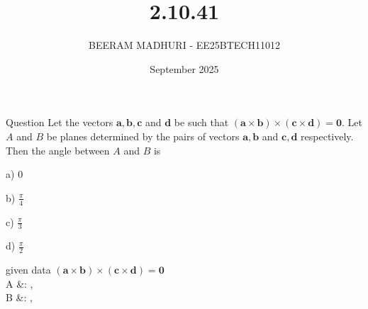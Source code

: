 \documentclass{beamer}
\title %
{2.10.41}
\date{September  2025}
\author %
{BEERAM MADHURI - EE25BTECH11012}
\begin{document}
\frame{\titlepage}
\begin{frame}{Question}
 Let the vectors $\mathbf{a}, \mathbf{b}, \mathbf{c}$ and $\mathbf{d}$ be such that $(\mathbf{a} \times \mathbf{b}) \times (\mathbf{c} \times \mathbf{d}) = \mathbf{0}$. Let $A$ and $B$ be planes determined by the pairs of vectors $\mathbf{a}, \mathbf{b}$ and $\mathbf{c}, \mathbf{d}$ respectively. Then the angle between $A$ and $B$ is

\begin{enumerate}
\begin{multicols}{4}
\item[a)] $0$
\item[b)] $\frac{\pi}{4}$
\item[c)] $\frac{\pi}{3}$
\item[d)] $\frac{\pi}{2}$
\end{multicols}
\end{enumerate}
 

\end{frame}
 
\begin{frame}{given data}
$(\mathbf{a} \times \mathbf{b}) \times (\mathbf{c} \times \mathbf{d}) = \mathbf{0}$\\
A &:  ,  \\
B &:  , 
\end{frame}
 
\end{document}

